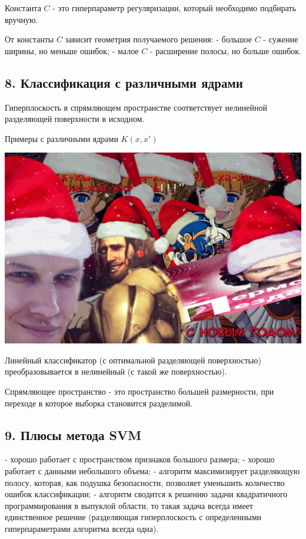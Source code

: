 Константа $C$ - это гиперпараметр регуляризации, который необходимо
подбирать вручную.

От константы $C$ зависит геометрия получаемого решения:
- большое $C$ - сужение ширины, но меньше ошибок;
- малое $C$ - расширение полосы, но больше ошибок.

\subsection{8. Классификация с различными ядрами}

Гиперплоскость в спрямляющем пространстве соответствует нелинейной
разделяющей поверхности в исходном.

Примеры с различными ядрами $K{(x, x')}$

\includegraphics[scale=0.3]{figures/samplefigure.jpg}

Линейный классификатор (с оптимальной разделяющей поверхностью)
преобразовывается в нелинейный (с такой же поверхностью).

Спрямляющее пространство - это пространство большей размерности, при
переходе в которое выборка становится разделимой.

\subsection{9. Плюсы метода SVM}

- хорошо работает с пространством признаков большого размера;
- хорошо работает с данными небольшого объема;
- алгоритм максимизирует разделяющую полосу, которая, как подушка
безопасности, позволяет уменьшить количество ошибок классификации;
- алгоритм сводится к решению задачи квадратичного программирования в
выпуклой области, то такая задача всегда имеет единственное решение
(разделяющая гиперплоскость с определенными гиперпараметрами алгоритма
всегда одна).

